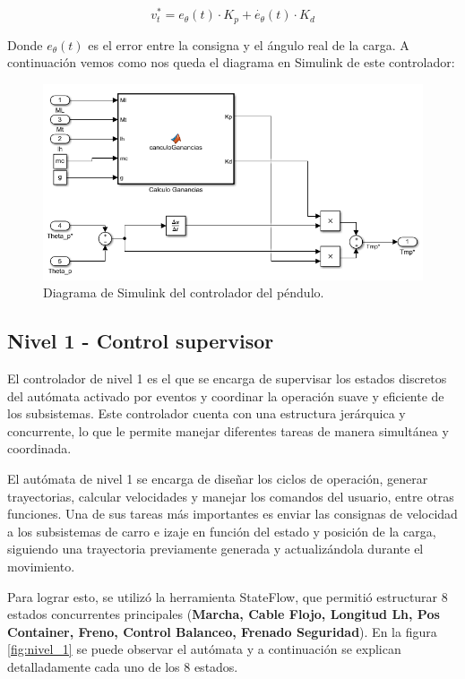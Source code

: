 \documentclass[11pt]{article}
\begin{document}
\begin{equation}
	\label{eq:velocidad_salida_controlador}
	v_t^{*}=e_\theta(t)\cdot K_p+\dot{e_{\theta}}(t)\cdot K_d
\end{equation}

Donde $e_\theta(t)$ es el error entre la consigna y el ángulo real de la carga. A continuación vemos como nos queda el diagrama en Simulink de este controlador:

\begin{figure}[h!]
	\centering
	\includegraphics[width=1\textwidth]{images/imagen_15_controlador_pendulo.png}
	\caption{Diagrama de Simulink del controlador del péndulo.}
	\label{fig:controlador_pendulo}
\end{figure}

\newpage
\subsection{Nivel 1 - Control supervisor}

El controlador de nivel 1 es el que se encarga de supervisar los estados discretos del autómata activado por eventos y coordinar la operación suave y eficiente de los subsistemas. Este controlador cuenta con una estructura jerárquica y concurrente, lo que le permite manejar diferentes tareas de manera simultánea y coordinada.

El autómata de nivel 1 se encarga de diseñar los ciclos de operación, generar trayectorias, calcular velocidades y manejar los comandos del usuario, entre otras funciones. Una de sus tareas más importantes es enviar las consignas de velocidad a los subsistemas de carro e izaje en función del estado y posición de la carga, siguiendo una trayectoria previamente generada y actualizándola durante el movimiento.

Para lograr esto, se utilizó la herramienta StateFlow, que permitió estructurar 8 estados concurrentes principales (\textbf{Marcha, Cable Flojo, Longitud Lh, Pos Container, Freno, Control Balanceo, Frenado Seguridad}). En la figura \ref{fig:nivel_1} se puede observar el autómata y a continuación se explican detalladamente cada uno de los 8 estados.
\end{document}

